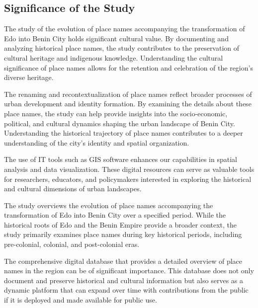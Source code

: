 \subsection{Significance of the Study}
The study of the evolution of place names accompanying the transformation of Edo into Benin City holds significant cultural value. By documenting and analyzing historical place names, the study contributes to the preservation of cultural heritage and indigenous knowledge. Understanding the cultural significance of place names allows for the retention and celebration of the region's diverse heritage. 

The renaming and recontextualization of place names reflect broader processes of urban development and identity formation. By examining the details about these place names, the study can help provide insights into the socio-economic, political, and cultural dynamics shaping the urban landscape of Benin City. Understanding the historical trajectory of place names contributes to a deeper understanding of the city's identity and spatial organization.

The use of IT tools such as GIS software enhances our capabilities in spatial analysis and data visualization. These digital resources can serve as valuable tools for researchers, educators, and policymakers interested in exploring the historical and cultural dimensions of urban landscapes.

The study overviews the evolution of place names accompanying the transformation of Edo into Benin City over a specified period. While the historical roots of Edo and the Benin Empire provide a broader context, the study primarily examines place names during key historical periods, including pre-colonial, colonial, and post-colonial eras.

The comprehensive digital database that provides a detailed overview of place names in the region can be of significant importance. This database does not only document and preserve historical and cultural information but also serves as a dynamic platform that can expand over time with contributions from the public if it is deployed and made available for public use.

